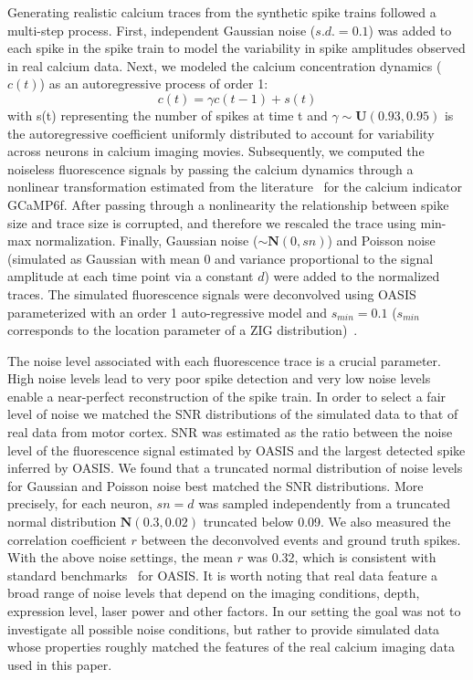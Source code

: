 \documentclass{article}
\begin{document}
Generating realistic calcium traces from the synthetic spike trains followed a multi-step process. First, independent Gaussian noise ($s.d. = 0.1$) was added to each spike in the spike train to model the variability in spike amplitudes observed in real calcium data. Next, we modeled the calcium concentration dynamics ($c(t)$) as an autoregressive process of order 1: 
 \begin{equation}
c(t) = \gamma c(t-1)+s(t)      
 \end{equation}
with s(t) representing the number of spikes at time t and $\gamma \sim \mathbf{U}(0.93, 0.95)$ is the autoregressive coefficient uniformly distributed to account for variability across neurons in calcium imaging movies. Subsequently, we computed the noiseless fluorescence signals by passing the calcium dynamics through a nonlinear transformation estimated from the literature~\cite{dana2019high} for the calcium indicator GCaMP6f. After passing through a nonlinearity the relationship between spike size and trace size is corrupted, and therefore we rescaled the trace using min-max normalization. Finally, Gaussian noise ($\sim \mathbf{N}(0,sn)$) and Poisson noise (simulated as Gaussian with mean 0 and variance proportional to the signal amplitude at each time point via a constant $d$) were added to the normalized traces. The simulated fluorescence signals were deconvolved using OASIS parameterized with an order 1 auto-regressive model and $s_{min}=0.1$ ($s_{min}$ corresponds to the location parameter of a ZIG distribution)~\cite{friedrich2017fast}.

The noise level associated with each fluorescence trace is a crucial parameter. High noise levels lead to very poor spike detection and very low noise levels enable a near-perfect reconstruction of the spike train. In order to select a fair level of noise we matched the SNR distributions of the simulated data to that of real data from motor cortex. SNR was estimated as the ratio between the noise level of the fluorescence signal estimated by OASIS and the largest detected spike inferred by OASIS. We found that a truncated normal distribution of noise levels for Gaussian and Poisson noise best matched the SNR distributions. More precisely, for each neuron, $sn=d$ was sampled independently from a truncated normal distribution $\mathbf{N}(0.3, 0.02)$ truncated below 0.09. We also measured the correlation coefficient $r$ between the deconvolved events and ground truth spikes. With the above noise settings, the mean $r$ was 0.32, which is consistent with standard benchmarks~\cite{berens2018spikefinder} for OASIS. It is worth noting that real data feature a broad range of noise levels that depend on the imaging conditions, depth, expression level, laser power and other factors. In our setting the goal was not to investigate all possible noise conditions, but rather to provide simulated data whose properties roughly matched the features of the real calcium imaging data used in this paper.
\end{document}
